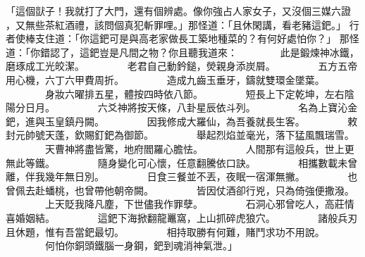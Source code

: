 \begin{pinyinscope}
{「這個獃子！我就打了大門，還有個辨處。像你強占人家女子，又沒個三媒六證
，又無些茶紅酒禮，該問個真犯斬罪哩。」那怪道：「且休閑講，看老豬這鈀。」
行者使棒支住道：「你這鈀可是與高老家做長工築地種菜的？有何好處怕你？」
那怪道：「你錯認了，這鈀豈是凡間之物？你且聽我道來：
　　　　此是鍛煉神冰鐵，磨琢成工光皎潔。
　　　　老君自己動鈐鎚，熒親身添炭屑。
　　　　五方五帝用心機，六丁六甲費周折。
　　　　造成九齒玉垂牙，鑄就雙環金墜葉。
　　　　身妝六曜排五星，體按四時依八節。
　　　　短長上下定乾坤，左右陰陽分日月。
　　　　六爻神將按天條，八卦星辰依斗列。
　　　　名為上寶沁金鈀，進與玉皇鎮丹闕。
　　　　因我修成大羅仙，為吾養就長生客。
　　　　敕封元帥號天蓬，欽賜釘鈀為御節。
　　　　舉起烈焰並毫光，落下猛風飄瑞雪。
　　　　天曹神將盡皆驚，地府閻羅心膽怯。
　　　　人間那有這般兵，世上更無此等鐵。
　　　　隨身變化可心懷，任意翻騰依口訣。
　　　　相攜數載未曾離，伴我幾年無日別。
　　　　日食三餐並不丟，夜眠一宿渾無撇。
　　　　也曾佩去赴蟠桃，也曾帶他朝帝闕。
　　　　皆因仗酒卻行兇，只為倚強便撒潑。
　　　　上天貶我降凡塵，下世儘我作罪孽。
　　　　石洞心邪曾吃人，高莊情喜婚姻結。
　　　　這鈀下海掀翻龍鼉窩，上山抓碎虎狼穴。
　　　　諸般兵刃且休題，惟有吾當鈀最切。
　　　　相持取勝有何難，賭鬥求功不用說。
　　　　何怕你銅頭鐵腦一身鋼，鈀到魂消神氣泄。」

}
\end{pinyinscope}
